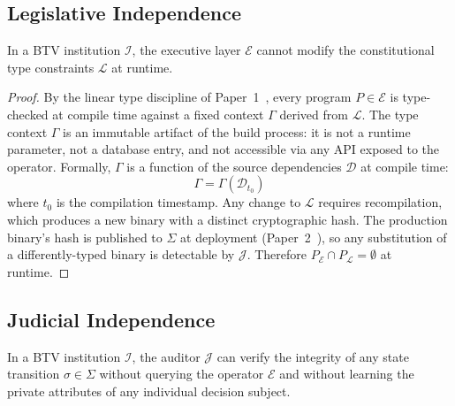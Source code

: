 \subsection{Legislative Independence}
\label{subsec:leg-independence}

\begin{theorem}
\label{thm:leg}
In a BTV institution $\mathcal{I}$, the executive layer $\mathcal{E}$
cannot modify the constitutional type constraints $\mathcal{L}$ at
runtime.
\end{theorem}

\begin{proof}
By the linear type discipline of Paper~1~\cite{btv2026}, every program
$P \in \mathcal{E}$ is type-checked at compile time against a fixed
context $\Gamma$ derived from $\mathcal{L}$. The type context $\Gamma$
is an immutable artifact of the build process: it is not a runtime
parameter, not a database entry, and not accessible via any API exposed
to the operator. Formally, $\Gamma$ is a function of the source
dependencies $\mathcal{D}$ at compile time:
\[
  \Gamma = \Gamma(\mathcal{D}_{t_0})
\]
where $t_0$ is the compilation timestamp. Any change to $\mathcal{L}$
requires recompilation, which produces a new binary with a distinct
cryptographic hash. The production binary's hash is published to
$\Sigma$ at deployment (Paper~2~\cite{btv-t-repo}), so any substitution
of a differently-typed binary is detectable by $\mathcal{J}$. Therefore
$P_{\mathcal{E}} \cap P_{\mathcal{L}} = \emptyset$ at runtime.
\end{proof}

\subsection{Judicial Independence}
\label{subsec:jud-independence}

\begin{theorem}
\label{thm:jud}
In a BTV institution $\mathcal{I}$, the auditor $\mathcal{J}$ can
verify the integrity of any state transition $\sigma \in \Sigma$
without querying the operator $\mathcal{E}$ and without learning the
private attributes of any individual decision subject.
\end{theorem}

